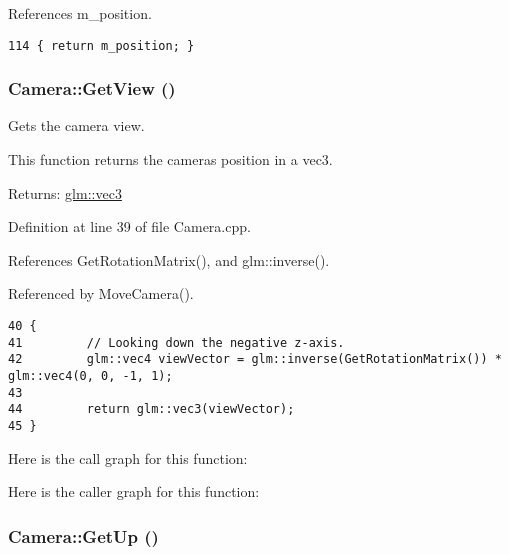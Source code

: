 References m\_\-position.

\begin{Code}\begin{verbatim}114 { return m_position; }
\end{verbatim}
\end{Code}


\hypertarget{class_camera_338c5baf20b57652828c53e0791adf9a}{
\subsubsection[GetView]{ Camera::GetView ()}}
\label{class_camera_338c5baf20b57652828c53e0791adf9a}


Gets the camera view. 

This function returns the cameras position in a vec3.

\begin{Desc}
\item[Returns:]\hyperlink{group__core__types_g1c47e8b3386109bc992b6c48e91b0be7}{glm::vec3} \end{Desc}


Definition at line 39 of file Camera.cpp.

References GetRotationMatrix(), and glm::inverse().

Referenced by MoveCamera().

\begin{Code}\begin{verbatim}40 {
41         // Looking down the negative z-axis.
42         glm::vec4 viewVector = glm::inverse(GetRotationMatrix()) * glm::vec4(0, 0, -1, 1);
43 
44         return glm::vec3(viewVector);
45 }
\end{verbatim}
\end{Code}




Here is the call graph for this function:

Here is the caller graph for this function:\hypertarget{class_camera_ff61f06284cca3216accdf556dfbd3c1}{
\subsubsection[GetUp]{ Camera::GetUp ()}}
\label{class_camera_ff61f06284cca3216accdf556dfbd3c1}


